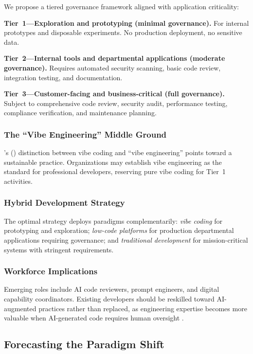 \documentclass[preprint,12pt,authoryear]{elsarticle}
\begin{document}
We propose a tiered governance framework aligned with application criticality:

\textbf{Tier~1---Exploration and prototyping (minimal governance).} For internal prototypes and disposable experiments. No production deployment, no sensitive data.

\textbf{Tier~2---Internal tools and departmental applications (moderate governance).} Requires automated security scanning, basic code review, integration testing, and documentation.

\textbf{Tier~3---Customer-facing and business-critical (full governance).} Subject to comprehensive code review, security audit, performance testing, compliance verification, and maintenance planning.

\subsubsection{The ``Vibe Engineering'' Middle Ground}

\citeauthor{Willison2025}'s (\citeyear{Willison2025}) distinction between vibe coding and ``vibe engineering'' points toward a sustainable practice. Organizations may establish vibe engineering as the standard for professional developers, reserving pure vibe coding for Tier~1 activities.

\subsubsection{Hybrid Development Strategy}

The optimal strategy deploys paradigms complementarily: \emph{vibe coding} for prototyping and exploration; \emph{low-code platforms} for production departmental applications requiring governance; and \emph{traditional development} for mission-critical systems with stringent requirements.

\subsubsection{Workforce Implications}

Emerging roles include AI code reviewers, prompt engineers, and digital capability coordinators. Existing developers should be reskilled toward AI-augmented practices rather than replaced, as engineering expertise becomes more valuable when AI-generated code requires human oversight \citep{Fawzy2025, DEVCommunity2025}.


\subsection{Forecasting the Paradigm Shift}
\end{document}
